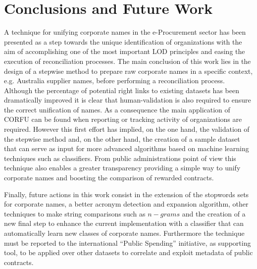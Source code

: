 \documentclass{llncs}
\begin{document}
\section{Conclusions and Future Work}
A technique for unifying corporate names in the e-Procurement sector has been 
presented as a step towards the unique identification of organizations 
with the aim of accomplishing one of the most important LOD principles 
and easing the execution of reconciliation processes. The main conclusion of this work 
lies in the design of a stepwise method to prepare raw corporate names in a specific 
context, e.g. Australia supplier names, before performing a reconciliation process. 
Although the percentage of potential right links to existing datasets has been dramatically 
improved it is clear that human-validation is also required to ensure the 
correct unification of names. As a consequence the main application of CORFU 
can be found when reporting or tracking activity of organizations are required. 
However this first effort has implied, on the one hand, the validation 
of the stepwise method and, on the other hand, the creation of a sample dataset 
that can serve as input for more advanced algorithms based on machine learning 
techniques such as classifiers. From public administrations point of view 
this technique also enables a greater transparency providing a simple 
way to unify corporate names and boosting the comparison of rewarded contracts.

Finally, future actions in this work consist in the extension of the stopwords sets 
for corporate names, a better acronym detection and expansion algorithm, other techniques to 
make string comparisons such as $n-grams$ and the creation of a new final step to enhance 
the current implementation with a classifier that can automatically learn new classes of corporate names. 
Furthermore the technique must be reported to the international ``Public Spending'' initiative, as supporting tool, 
to be applied over other datasets to correlate and exploit metadata of public contracts.




\end{document}
